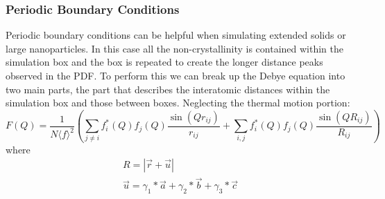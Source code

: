 \subsubsection{Periodic Boundary Conditions}
Periodic boundary conditions can be helpful when simulating extended solids or large nanoparticles. In this case all the non-crystallinity is contained within the simulation box and the box is repeated to create the longer distance peaks observed in the PDF. To perform this we can break up the Debye equation into two main parts, the part that describes the interatomic distances within the simulation box and those between boxes. Neglecting the thermal motion portion:
\begin{equation}
  F(Q) = \frac{1}{N \langle f \rangle^{2}}(\sum_{j\neq i} f_i^{*}(Q)f_j(Q) \frac{\sin(Qr_{ij})}{r_{ij}} + \sum_{i,j} f_i^{*}(Q)f_j(Q) \frac{\sin(QR_{ij})}{R_{ij}})
\end{equation}
where
\begin{eqnarray}
  R = |\vec{r} + \vec{u}|\\
  \vec{u} = \gamma_1*\vec{a} + \gamma_2*\vec{b} + \gamma_3*\vec{c}
\end{eqnarray}
